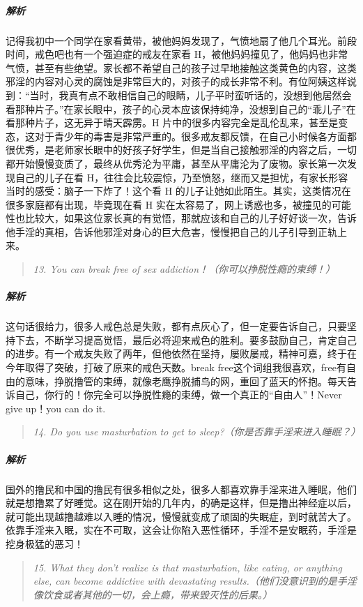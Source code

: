 \subparagraph{解析} 记得我初中一个同学在家看黄带，被他妈妈发现了，气愤地扇了他几个耳光。前段时间，戒色吧也有一个强迫症的戒友在家看 H，被他妈妈撞见了，他妈妈也非常气愤，甚至有些绝望。家长都不希望自己的孩子过早地接触这类黄色的内容，这类邪淫的内容对心灵的腐蚀是非常巨大的，对孩子的成长非常不利。有位阿姨这样说到：“当时，我真有点不敢相信自己的眼睛，儿子平时蛮听话的，没想到他居然会看那种片子。”在家长眼中，孩子的心灵本应该保持纯净，没想到自己的“乖儿子”在看那种片子，这无异于晴天霹雳。H 片中的很多内容完全是乱伦乱来，甚至是变态，这对于青少年的毒害是非常严重的。很多戒友都反馈，在自己小时候各方面都很优秀，是老师家长眼中的好孩子好学生，但是当自己接触邪淫的内容之后，一切都开始慢慢变质了，最终从优秀沦为平庸，甚至从平庸沦为了废物。家长第一次发现自己的儿子在看 H，往往会比较震惊，乃至愤怒，继而又是担忧，有家长形容当时的感受：脑子一下炸了！这个看 H 的儿子让她如此陌生。其实，这类情况在很多家庭都有出现，毕竟现在看 H 实在太容易了，网上诱惑也多，被撞见的可能性也比较大，如果这位家长真的有觉悟，那就应该和自己的儿子好好谈一次，告诉他手淫的真相，告诉他邪淫对身心的巨大危害，慢慢把自己的儿子引导到正轨上来。

\begin{quote}\it
    13. You can break free of sex addiction！（你可以挣脱性瘾的束缚！）
\end{quote}

\subparagraph{解析} 这句话很给力，很多人戒色总是失败，都有点灰心了，但一定要告诉自己，只要坚持下去，不断学习提高觉悟，最后必将迎来戒色的胜利。要多鼓励自己，肯定自己的进步。有一个戒友失败了两年，但他依然在坚持，屡败屡戒，精神可嘉，终于在今年取得了突破，打破了原来的戒色天数。break free这个词组我很喜欢，free有自由的意味，挣脱撸管的束缚，就像老鹰挣脱捕鸟的网，重回了蓝天的怀抱。每天告诉自己，你行的！你完全可以挣脱性瘾的束缚，做一个真正的“自由人”！Never give up！you can do it.

\begin{quote}\it
    14. Do you use masturbation to get to sleep?（你是否靠手淫来进入睡眠？）
\end{quote}

\subparagraph{解析} 国外的撸民和中国的撸民有很多相似之处，很多人都喜欢靠手淫来进入睡眠，他们就是想撸累了好睡觉。这在刚开始的几年内，的确是这样，但是撸出神经症以后，就可能出现越撸越难以入睡的情况，慢慢就变成了顽固的失眠症，到时就苦大了。依靠手淫来入眠，实在不可取，这会让你陷入恶性循环，手淫不是安眠药，手淫是挖身极猛的恶习！

\begin{quote}\it
    15. What they don't realize is that masturbation, like eating, or anything else, can become addictive with devastating results.（他们没意识到的是手淫像饮食或者其他的一切，会上瘾，带来毁灭性的后果。）
\end{quote}


